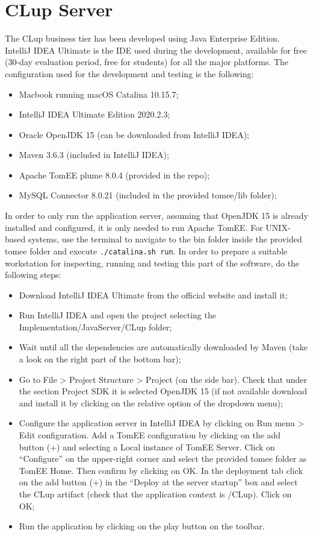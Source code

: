 \documentclass[a4paper,oneside,11pt]{book}
\begin{document}
    \section{CLup Server}
    The CLup business tier has been developed using Java Enterprise Edition. IntelliJ IDEA Ultimate is the IDE used during the development, available for free (30-day evaluation period, free for students) for all the major platforms. The configuration used for the development and testing is the following:
    \begin{itemize}
        \item Macbook running macOS Catalina 10.15.7;
        \item IntelliJ IDEA Ultimate Edition 2020.2.3;
        \item Oracle OpenJDK 15 (can be downloaded from IntelliJ IDEA);
        \item Maven 3.6.3 (included in IntelliJ IDEA);
        \item Apache TomEE plume 8.0.4 (provided in the repo);
        \item MySQL Connector 8.0.21 (included in the provided tomee/lib folder);
    \end{itemize}
    In order to only run the application server, assuming that OpenJDK 15 is already installed and configured, it is only needed to run Apache TomEE. For UNIX-based systems, use the terminal to navigate to the bin folder inside the provided tomee folder and execute \texttt{./catalina.sh run}.
    In order to prepare a suitable workstation for inspecting, running and testing this part of the software, do the following steps:
    \begin{itemize}
        \item Download IntelliJ IDEA Ultimate from the official website and install it;
        \item Run IntelliJ IDEA and open the project selecting the Implementation/JavaServer/CLup folder;
        \item Wait until all the dependencies are automatically downloaded by Maven (take a look on the right part of the bottom bar);
        \item Go to File > Project Structure > Project (on the side bar). Check that under the section Project SDK it is selected OpenJDK 15 (if not available download and install it by clicking on the relative option of the dropdown menu);
        \item Configure the application server in IntelliJ IDEA by clicking on Run menu > Edit configuration. Add a TomEE configuration by clicking on the add button (+) and selecting a Local instance of TomEE Server. Click on “Configure” on the upper-right corner and select the provided tomee folder as TomEE Home. Then confirm by clicking on OK. In the deployment tab click on the add button (+) in the “Deploy at the server startup” box and select the CLup artifact (check that the application context is /CLup). Click on OK;
        \item Run the application by clicking on the play button on the toolbar.
    \end{itemize}
\end{document}
